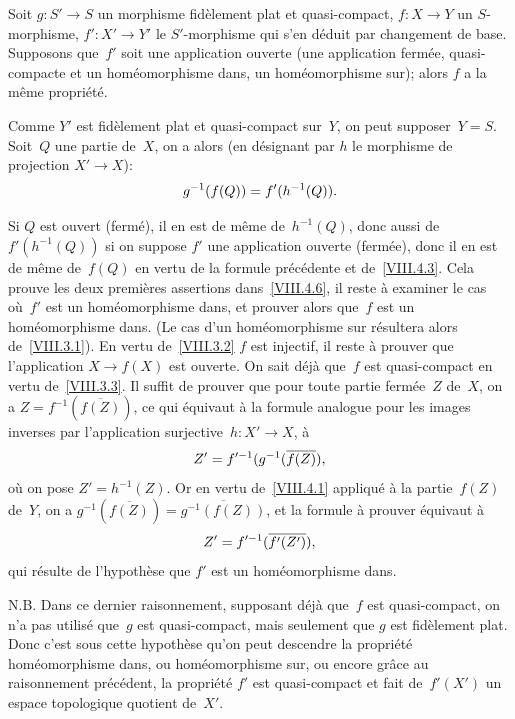 \begin{corollaire}
\label{VIII.4.6}
Soit $g\colon S'\to S$ un morphisme fid\`element plat et
quasi-compact, $f\colon X\to Y$ un $S$-morphisme, $f'\colon X'\to Y'$
le $S'$-morphisme qui s'en d\'eduit par changement de
base. Supposons que~$f'$ soit une application ouverte (\resp une
application ferm\'ee, \resp quasi-compacte
et un hom\'eomorphisme dans, \resp un hom\'eomorphisme sur); alors
$f$ a la m\^eme propri\'et\'e.
\end{corollaire}

Comme $Y'$ est fid\`element plat et quasi-compact sur~$Y$, on peut
supposer~$Y=S$. Soit~$Q$
une partie de~$X$, on a alors (en d\'esignant par $h$ le morphisme
de projection $X'\to X$):
$$
g^{-1}(f(Q))=f'(h^{-1}(Q)).
$$

Si $Q$ est ouvert (\resp ferm\'e), il en est de m\^eme
de~$h^{-1}(Q)$, donc aussi de~$f'(h^{-1}(Q))$ si on suppose $f'$ une
application ouverte (\resp ferm\'ee), donc il en est de m\^eme
de~$f(Q)$ en vertu de la formule pr\'ec\'edente et
de~\ref{VIII.4.3}. Cela prouve les deux premi\`eres assertions
dans~\ref{VIII.4.6}, il reste \`a examiner le cas o\`u~$f'$ est un
hom\'eomorphisme dans, et prouver alors que~$f$ est un
hom\'eomorphisme dans. (Le cas d'un hom\'eomorphisme sur
r\'esultera alors de~\ref{VIII.3.1}). En vertu
de~\ref{VIII.3.2}
$f$ est injectif, il reste \`a prouver que l'application $X\to f(X)$
est ouverte. On sait d\'ej\`a que~$f$ est quasi-compact en vertu
de~\ref{VIII.3.3}. Il suffit de prouver que pour toute partie
ferm\'ee~$Z$ de~$X$, on a $Z=f^{-1}(\overline{f(Z)})$, ce qui
\'equivaut \`a la formule analogue pour les images inverses par
l'application surjective~$h\colon X'\to X$, \ie \`a
$$
Z'=f'^{-1}(g^{-1}(\overline{f(Z)}),
$$
o\`u on pose $Z'=h^{-1}(Z)$. Or en vertu de~\ref{VIII.4.1}
appliqu\'e \`a la partie~$f(Z)$ de~$Y$, on a
$g^{-1}(\overline{f(Z)})=\overline{g^{-1}(f(Z))}$, et la formule \`a
prouver \'equivaut \`a
$$
Z'=f'^{-1}(\overline{f'(Z')}),
$$
qui r\'esulte de l'hypoth\`ese que $f'$ est un hom\'eomorphisme
dans.

N.B. Dans ce dernier raisonnement, supposant d\'ej\`a que~$f$ est
quasi-compact, on n'a pas utilis\'e que~$g$ est quasi-compact, mais
seulement que
$g$
est fid\`element plat. Donc c'est sous cette hypoth\`ese qu'on
peut descendre la propri\'et\'e \og hom\'eomorphisme dans\fg, ou
\og hom\'eomorphisme sur\fg, ou encore gr\^ace au raisonnement
pr\'ec\'edent, la propri\'et\'e \og $f'$ est quasi-compact et
fait de~$f'(X')$ un espace topologique quotient de~$X'$\fg.

